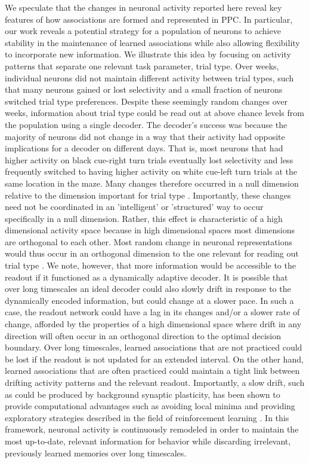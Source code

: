 We speculate that the changes in neuronal activity reported here reveal key features of how associations are formed and represented in PPC. In particular, our work reveals a potential strategy for a population of neurons to achieve stability in the maintenance of learned associations while also allowing flexibility to incorporate new information. We illustrate this idea by focusing on activity patterns that separate one relevant task parameter, trial type. Over weeks, individual neurons did not maintain different activity between trial types, such that many neurons gained or lost selectivity and a small fraction of neurons switched trial type preferences. Despite these seemingly random changes over weeks, information about trial type could be read out at above chance levels from the population using a single decoder. The decoder's success was because the majority of neurons did not change in a way that their activity had opposite implications for a decoder on different days. That is, most neurons that had higher activity on black cue-right turn trials eventually lost selectivity and less frequently switched to having higher activity on white cue-left turn trials at the same location in the maze. Many changes therefore occurred in a null dimension relative to the dimension important for trial type \citep{Ajemian2013, Rokni2007a}. Importantly, these changes need not be coordinated in an 'intelligent' or 'structured' way to occur specifically in a null dimension. Rather, this effect is characteristic of a high dimensional activity space because in high dimensional spaces most dimensions are orthogonal to each other. Most random change in neuronal representations would thus occur in an orthogonal dimension to the one relevant for reading out trial type \citep{Buonomano2009}. We note, however, that more information would be accessible to the readout if it functioned as a dynamically adaptive decoder. It is possible that over long timescales an ideal decoder could also slowly drift in response to the dynamically encoded information, but could change at a slower pace. In such a case, the readout network could have a lag in its changes and/or a slower rate of change, afforded by the properties of a high dimensional space where drift in any direction will often occur in an orthogonal direction to the optimal decision boundary. Over long timescales, learned associations that are not practiced could be lost if the readout is not updated for an extended interval. On the other hand, learned associations that are often practiced could maintain a tight link between drifting activity patterns and the relevant readout. Importantly, a slow drift, such as could be produced by background synaptic plasticity, has been shown to provide computational advantages such as avoiding local minima and providing exploratory strategies described in the field of reinforcement learning \citep{Kappel2015, Yu2016}. In this framework, neuronal activity is continuously remodeled in order to maintain the most up-to-date, relevant information for behavior while discarding irrelevant, previously learned memories over long timescales. 

